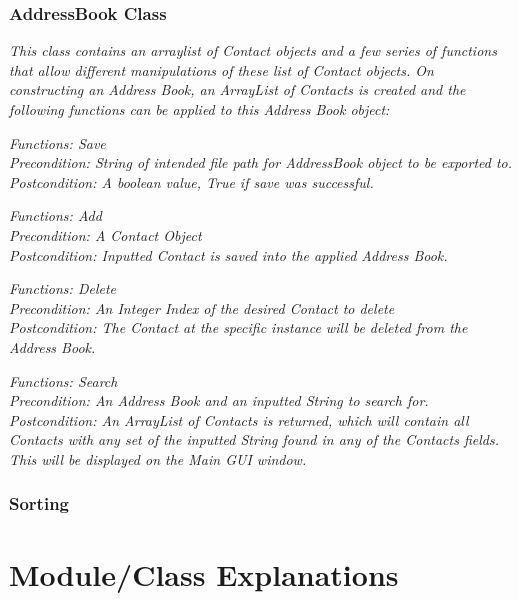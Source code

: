 \documentclass[a4paper, 11pt]{article}
\begin{document}
\subsubsection{AddressBook Class}
\textit{This class contains an arraylist of Contact objects and a few series of functions that allow different manipulations of these list of Contact objects. On constructing an Address Book, an ArrayList of Contacts is created and the following functions can be applied to this Address Book object:}
%

\textit{Functions: Save}\\
\textit{Precondition: String of intended file path for AddressBook object to be exported to.}\\
\textit{Postcondition: A boolean value, True if save was successful.}

\textit{Functions: Add}\\
\textit{Precondition: A Contact Object}\\
\textit{Postcondition: Inputted Contact is saved into the applied Address Book.}

\textit{Functions: Delete}\\
\textit{Precondition: An Integer Index of the desired Contact to delete}\\
\textit{Postcondition: The Contact at the specific instance will be deleted from the Address Book.}

\textit{Functions: Search}\\
\textit{Precondition: An Address Book and an inputted String to search for.}\\
\textit{Postcondition: An ArrayList of Contacts is returned, which will contain all Contacts with any set of the inputted String found in any of the Contacts fields. This will be displayed on the Main GUI window.}
\subsubsection{Sorting}





\section{Module/Class Explanations}
\end{document}
